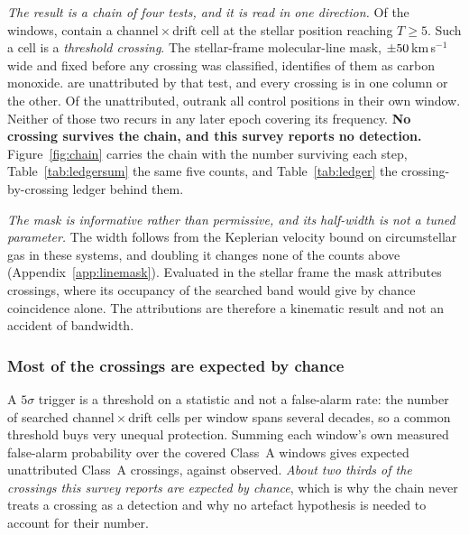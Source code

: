 \emph{The result is a chain of four tests, and it is read in one direction.}
Of the \NWindows{} windows, \NCross{} contain a channel\,$\times$\,drift
cell at the stellar position reaching $T\geq5$. Such a cell is a
\emph{threshold crossing}. The stellar-frame molecular-line mask,
$\pm\MaskHalfKms$\,km\,s$^{-1}$ wide and fixed before any crossing was
classified, identifies \NAttributed{} of them as carbon monoxide.
\NUnattributed{} are unattributed by that test, and every crossing is in one
column or the other. Of the unattributed, \NUnattrRankFlagged{} outrank
all \NCtrl{} control positions in their own window. Neither of those two
recurs in any later epoch covering its frequency. \textbf{No crossing
survives the chain, and this survey reports no detection.}
Figure~\ref{fig:chain} carries the chain with the number surviving each
step, Table~\ref{tab:ledgersum} the same five counts, and
Table~\ref{tab:ledger} the crossing-by-crossing ledger behind them.

\begin{table}
\centering
\footnotesize
\caption{The result in five counts, each read from the rows of
Table~\ref{tab:ledger} so that the two cannot disagree. The line
attribution is evaluated in the stellar frame at the adopted
$\pm\MaskHalfKms$\,km\,s$^{-1}$ half-width, and the last two lines are the
spatial screen and the recurrence test applied in that order.}
\label{tab:ledgersum}
\scriptsize

\end{table}

\emph{The mask is informative rather than permissive, and its half-width is
not a tuned parameter.} The width follows from the Keplerian velocity bound
on circumstellar gas in these systems, and doubling it changes none of the
counts above (Appendix~\ref{app:linemask}). Evaluated in the stellar frame
the mask attributes \NAttributed{} crossings, where its occupancy of the
searched band would give \LgExpAttr{} by chance coincidence alone. The
attributions are therefore a kinematic result and not an accident of
bandwidth.

\subsubsection{Most of the crossings are expected by chance}
\label{sec:trigunif}

A $5\sigma$ trigger is a threshold on a statistic and not a false-alarm
rate: the number of searched channel\,$\times$\,drift cells per window spans
several decades, so a common threshold buys very unequal protection.
Summing each window's own measured false-alarm probability over the covered
Class~A windows gives \RsevChanceExp{} expected unattributed Class~A
crossings, against \RsevChanceObsAUnattr{} observed. \emph{About two thirds
of the crossings this survey reports are expected by chance}, which is why
the chain never treats a crossing as a detection and why no artefact
hypothesis is needed to account for their number.

